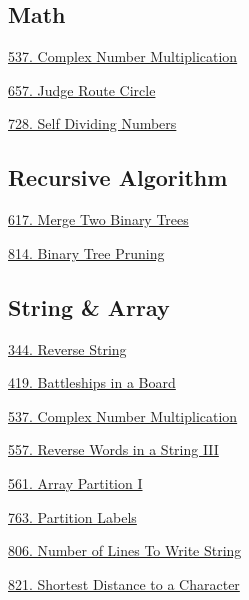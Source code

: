 \subsection*{Math}
\begin{flushleft}
    \hyperref[algo:537]{537. Complex Number Multiplication}

    \hyperref[algo:657]{657. Judge Route Circle}
    
    \hyperref[algo:728]{728. Self Dividing Numbers}
\end{flushleft}

\subsection*{Recursive Algorithm}
\begin{flushleft}
    \hyperref[algo:617]{617. Merge Two Binary Trees}

    \hyperref[algo:814]{814. Binary Tree Pruning}
\end{flushleft}

\subsection*{String \& Array}
\begin{flushleft}
    \hyperref[algo:344]{344. Reverse String}

    \hyperref[algo:419]{419. Battleships in a Board}

    \hyperref[algo:537]{537. Complex Number Multiplication}
    
    \hyperref[algo:557]{557. Reverse Words in a String III}

    \hyperref[algo:561]{561. Array Partition I}
    
    \hyperref[algo:763]{763. Partition Labels}
    
    \hyperref[algo:806]{806. Number of Lines To Write String}
    
    \hyperref[algo:821]{821. Shortest Distance to a Character}
\end{flushleft}
